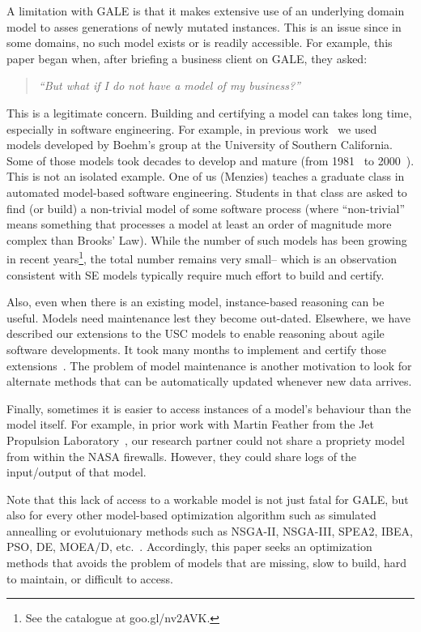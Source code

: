 \documentclass[conference]{IEEEtran}
\begin{document}
A limitation with GALE is that it makes extensive use of
an underlying domain model to asses generations of newly mutated instances.  This is an issue since
in some domains, no such model exists or is readily accessible. For example, this   paper
began when, after briefing a business client on GALE, they asked:
\begin{quote}
{\em ``But what if I do not have a model of my business?''}
\end{quote}
This is a legitimate concern.
Building and certifying a model  can  takes  long time, especially in software engineering. For  example, in previous work~\cite{me07f} we used models
developed by Boehm's group at the University of Southern California.
Some of those models took decades to develop and mature (from 1981~\cite{boehm81} to 2000~\cite{boehm00b}).  This is not an isolated example. One of us (Menzies) teaches a graduate class in automated model-based software engineering. 
Students in that class are asked to find (or build) a non-trivial model of
some software process (where ``non-trivial'' means something that processes
a  model at least an order of magnitude more complex than Brooks' Law). 
While the  number of such models has been growing in recent years\footnote{See the
catalogue at goo.gl/nv2AVK.}, 
the total number remains very small-- which is an observation consistent with
SE models typically require  much effort to build and certify.

Also, even when there is an existing model, instance-based reasoning can be useful.
Models need maintenance lest they become out-dated. Elsewhere, we have described our
extensions to the USC models to enable reasoning about agile software developments. 
It took many months to implement and certify those extensions~\cite{me09i,me09j}.
The problem of model maintenance is another
motivation to look for alternate methods that can be automatically updated whenever new data arrives.

Finally, sometimes  it is easier to access instances of a model's behaviour than the model
itself. For example, in prior work with Martin  Feather from the Jet Propulsion 
Laboratory~\cite{fea02a},  our research partner could not share a
propriety model from within the NASA firewalls. However, they could share 
logs of the input/output of that model.
 
Note that this lack of access to a workable model is not just fatal for GALE, but also for every
other model-based optimization algorithm such as simulated
annealling or evolutuionary methods such as   
NSGA-II, NSGA-III, SPEA2, IBEA, PSO, DE, MOEA/D, etc.~\cite{deb00a,zit02,zit04,%
deb14,Cui2005a,storn97,zhang07:TEC}. Accordingly, this paper seeks
an optimization methods that avoids the problem of models that are missing, slow
to build, hard to maintain, or difficult to access.
\end{document}
